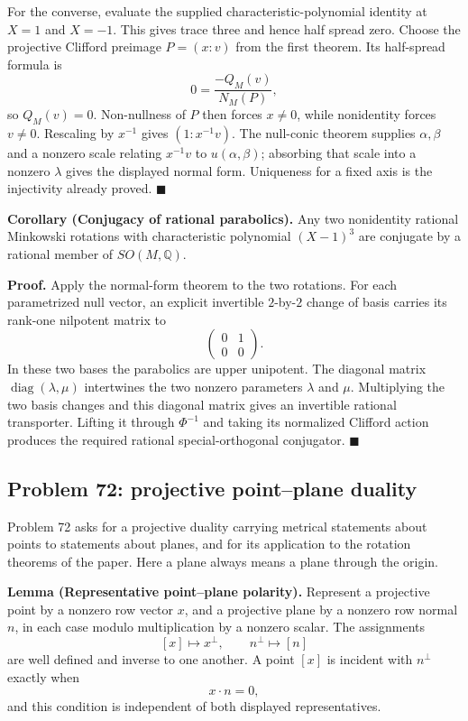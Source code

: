 \documentclass[11pt]{article}
\begin{document}
For the converse, evaluate the supplied characteristic-polynomial identity
at \(X=1\) and \(X=-1\).  This gives trace three and hence half spread zero.
Choose the projective Clifford preimage \(P=(x:v)\) from the first theorem.
Its half-spread formula is
\[
 0=\frac{-Q_M(v)}{N_M(P)},
\]
so \(Q_M(v)=0\).  Non-nullness of \(P\) then forces \(x\ne0\), while
nonidentity forces \(v\ne0\).  Rescaling by \(x^{-1}\) gives
\((1:x^{-1}v)\).  The null-conic theorem supplies
\(\alpha,\beta\) and a nonzero scale relating \(x^{-1}v\) to
\(u(\alpha,\beta)\); absorbing that scale into a nonzero \(\lambda\) gives
the displayed normal form.  Uniqueness for a fixed axis is the injectivity
already proved.
\hfill\(\blacksquare\)

\medskip
\noindent\textbf{Corollary (Conjugacy of rational parabolics).}
Any two nonidentity rational Minkowski rotations with characteristic
polynomial \((X-1)^3\) are conjugate by a rational member of
\(SO(M,\mathbb Q)\).

\smallskip
\noindent\textbf{Proof.}
Apply the normal-form theorem to the two rotations.  For each parametrized
null vector, an explicit invertible \(2\)-by-\(2\) change of basis carries
its rank-one nilpotent matrix to
\[
 \begin{pmatrix}0&1\\0&0\end{pmatrix}.
\]
In these two bases the parabolics are upper unipotent.  The diagonal matrix
\(\operatorname{diag}(\lambda,\mu)\) intertwines the two nonzero parameters
\(\lambda\) and \(\mu\).  Multiplying the two basis changes and this diagonal
matrix gives an invertible rational transporter.  Lifting it through
\(\Phi^{-1}\) and taking its normalized Clifford action produces the required
rational special-orthogonal conjugator.
\hfill\(\blacksquare\)

\subsection{Problem 72: projective point--plane duality}

Problem 72 asks for a projective duality carrying metrical statements about
points to statements about planes, and for its application to the rotation
theorems of the paper.  Here a plane always means a plane through the origin.

\medskip
\noindent\textbf{Lemma (Representative point--plane polarity).}
Represent a projective point by a nonzero row vector \(x\), and a projective
plane by a nonzero row normal \(n\), in each case modulo multiplication by a
nonzero scalar.  The assignments
\[
 [x]\longmapsto x^\perp,\qquad
 n^\perp\longmapsto[n]
\]
are well defined and inverse to one another.  A point \([x]\) is incident
with \(n^\perp\) exactly when
\[
 x\mathbin{\cdot}n=0,
\]
and this condition is independent of both displayed representatives.
\end{document}
